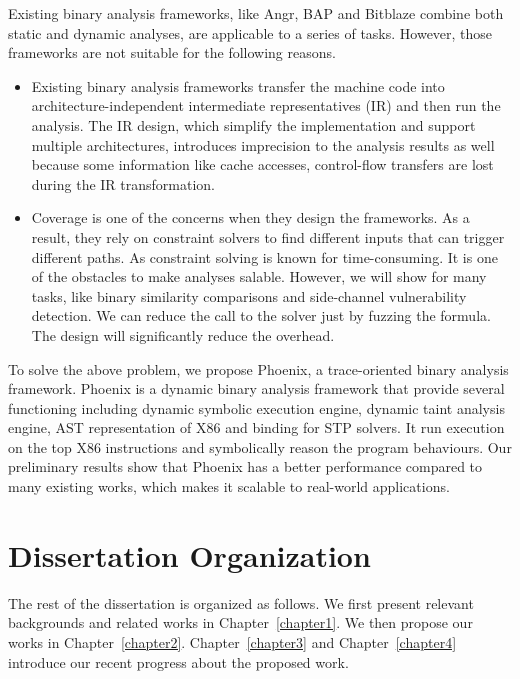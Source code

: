 Existing binary analysis frameworks, like Angr, BAP and Bitblaze combine both static
and dynamic analyses, are applicable to a series of tasks. However, those frameworks
are not suitable for the following reasons. 
\begin{itemize}
    \item Existing binary analysis frameworks transfer the machine code into
    architecture-independent intermediate representatives (IR) and then run the
    analysis. The IR design, which simplify the implementation and support multiple
    architectures, introduces imprecision to the analysis results as well because some
    information like cache accesses, control-flow transfers are lost during the IR
    transformation.
    \item Coverage is one of the concerns when they design the frameworks. 
    As a result, they rely on constraint solvers to find different inputs that can
    trigger different paths. As constraint solving is known for time-consuming. It is
    one of the obstacles to make analyses salable.
    However, we will show for many tasks, like binary similarity comparisons and side-channel vulnerability detection. We can
    reduce the call to the solver just by fuzzing the formula. The design will
    significantly reduce the overhead.
\end{itemize}
To solve the above problem, we propose Phoenix, a trace-oriented binary analysis
framework. Phoenix is a dynamic binary analysis framework that provide several 
functioning including dynamic symbolic execution engine, dynamic taint analysis
engine, AST representation of X86 and binding for STP solvers. It run 
execution on the top X86 instructions and symbolically reason the program behaviours.
Our preliminary results show that Phoenix has a better performance compared to 
many existing works, which makes it scalable to real-world applications.


\section{Dissertation Organization}
The rest of the dissertation is organized as follows. We first present relevant backgrounds and related works in Chapter~\ref{chapter1}. We then propose our works in
Chapter~\ref{chapter2}. Chapter~\ref{chapter3} and Chapter~\ref{chapter4} introduce
our recent progress about the proposed work. 
